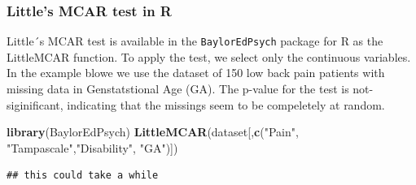 \documentclass[]{book}
\newenvironment{Shaded}{\begin{snugshade}}{\end{snugshade}}
\newcommand{\KeywordTok}[1]{\textcolor[rgb]{0.13,0.29,0.53}{\textbf{#1}}}
\newcommand{\StringTok}[1]{\textcolor[rgb]{0.31,0.60,0.02}{#1}}
\newcommand{\NormalTok}[1]{#1}
\theoremstyle{definition}
\theoremstyle{definition}
\theoremstyle{definition}
\theoremstyle{remark}
\begin{document}
\subsubsection{Little's MCAR test in R}\label{littles-mcar-test-in-r}

Little´s MCAR test is available in the \texttt{BaylorEdPsych} package
for R as the LittleMCAR function. To apply the test, we select only the
continuous variables. In the example blowe we use the dataset of 150 low
back pain patients with missing data in Genstatstional Age (GA). The
p-value for the test is not-siginificant, indicating that the missings
seem to be compeletely at random.

\begin{Shaded}
\begin{Highlighting}[]
\KeywordTok{library}\NormalTok{(BaylorEdPsych)}
\KeywordTok{LittleMCAR}\NormalTok{(dataset[,}\KeywordTok{c}\NormalTok{(}\StringTok{"Pain"}\NormalTok{, }\StringTok{"Tampascale"}\NormalTok{,}\StringTok{"Disability"}\NormalTok{, }\StringTok{"GA"}\NormalTok{)])}
\end{Highlighting}
\end{Shaded}

\begin{verbatim}
## this could take a while
\end{verbatim}
\end{document}
